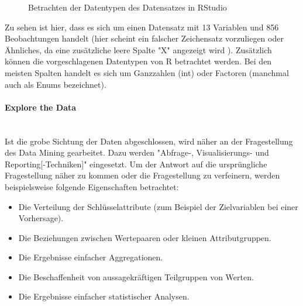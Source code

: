 \begin{figure}[H]
\caption{Betrachten der Datentypen des Datensatzes in RStudio}
\label{fig:Lasagne_RStudio}
\centering
\end{figure}
Zu sehen ist hier, dass es sich um einen Datensatz mit 13 Variablen und 856 Beobachtungen handelt (hier scheint ein falscher Zeichensatz vorzuliegen oder Ähnliches, da eine zusätzliche leere Spalte "X" angezeigt wird ). Zusätzlich können die vorgeschlagenen Datentypen von R betrachtet werden. Bei den meisten Spalten handelt es sich um Ganzzahlen (int) oder Factoren (manchmal auch als Enums bezeichnet).

\paragraph{Explore the Data}\mbox{} \\
Ist die grobe Sichtung der Daten abgeschlossen, wird näher an der Fragestellung des Data Mining gearbeitet. Dazu werden "Abfrage-, Visualisierungs- und Reporting[-Techniken]"\citep[S.~16; eigene Übersetzung]{shearer_crisp-dm_2000} eingesetzt. Um der Antwort auf die ursprüngliche Fragestellung näher zu kommen oder die Fragestellung zu verfeinern, werden beispielsweise folgende Eigenschaften betrachtet\citep[S.~18; eigene Übersetzung]{chapman_crisp-dm_2000}:
\begin{itemize}
\item Die Verteilung der Schlüsselattribute (zum Beispiel der Zielvariablen bei einer Vorhersage).
\item Die Beziehungen zwischen Wertepaaren oder kleinen Attributgruppen.
\item Die Ergebnisse einfacher Aggregationen.
\item Die Beschaffenheit von aussagekräftigen Teilgruppen von Werten.
\item Die Ergebnisse einfacher statistischer Analysen.
\end{itemize}

